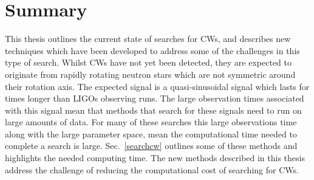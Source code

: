 \chapter{\label{summary}Summary}


This thesis outlines the current state of searches for \glspl{CW}, and describes new techniques which have been developed to address some of the challenges in this type of search.
Whilst \glspl{CW} have not yet been detected, they are expected to originate from rapidly rotating neutron stars which are not symmetric around their rotation axis.
The expected signal is a quasi-sinusoidal signal which lasts for times longer than \glspl{LIGO} observing runs.
The large observation times associated with this signal mean that methods that search for these signals need to run on large amounts of data.
For many of these searches this large observations time along with the large parameter space, mean the computational time needed to complete a search is large. 
Sec.~\ref{searchcw} outlines some of these methods and highlights the needed computing time.
The new methods described in this thesis address the challenge of reducing the computational cost of searching for \glspl{CW}.

\bigskip

